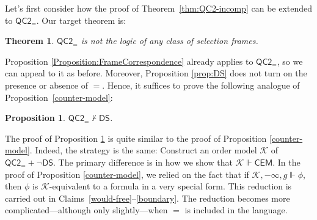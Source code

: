 \documentclass[12pt]{article}
\newtheorem{theorem}{Theorem}
\newtheorem{proposition}{Proposition}
\begin{document}
Let's first consider how the proof of Theorem~\ref{thm:QC2-incomp} can be extended to $\mathsf{QC2_=}$. 
Our target theorem is:

\begin{theorem}
\label{thm:QC2=-incomp}
    $\mathsf{QC2_=}$ is not the logic of any class of selection frames.
\end{theorem}




Proposition \ref{Proposition:FrameCorrespondence} already applies to $\mathsf{QC2_=}$, so we can appeal to it as before. 
Moreover, Proposition \ref{prop:DS} does not turn on the presence or absence of $=$. 
Hence, it suffices to prove the following analogue of Proposition~\ref{counter-model}:

\begin{proposition}\label{new-counter-model}
    $\mathsf{QC2_=} \nvdash \mathsf{DS}$.
\end{proposition}

The proof of Proposition \ref{new-counter-model} is quite similar to the proof of Proposition \ref{counter-model}.
Indeed, the strategy is the same: Construct an order model $\mathcal{K}$ of $\mathsf{QC2_=}+\neg\mathsf{DS}$. 
The primary difference is in how we show that  $\mathcal{K} \Vdash \mathsf{CEM}$. 
In the proof of Proposition \ref{counter-model}, we relied on the fact that if $\mathcal{K},-\infty,g \Vdash \phi$, then $\phi$ is $\mathcal{K}$-equivalent to a formula in a very special form. 
This reduction is carried out in Claims~\ref{would-free}--\ref{boundary}.
The reduction becomes more complicated---although only slightly---when $=$ is included in the language.
\end{document}

